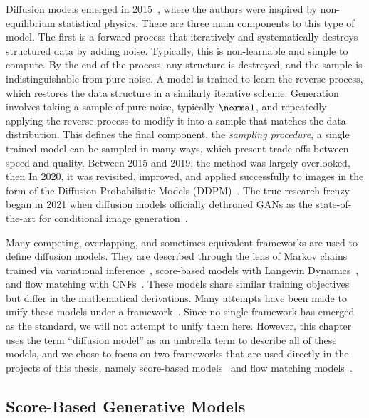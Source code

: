Diffusion models emerged in 2015~\cite{DeepUnsupervisedLearning}, where the authors were inspired by non-equilibrium statistical physics.
There are three main components to this type of model.
The first is a forward-process that iteratively and systematically destroys structured data by adding noise.
Typically, this is non-learnable and simple to compute.
By the end of the process, any structure is destroyed, and the sample is indistinguishable from pure noise.
A model is trained to learn the reverse-process, which restores the data structure in a similarly iterative scheme.
Generation involves taking a sample of pure noise, typically $\normal$,  and repeatedly applying the reverse-process to modify it into a sample that matches the data distribution.
This defines the final component, the \textit{sampling procedure}, a single trained model can be sampled in many ways, which present trade-offs between speed and quality.
Between 2015 and 2019, the method was largely overlooked, then
In 2020, it was revisited, improved, and applied successfully to images in the form of the Diffusion Probabilistic Models (DDPM)~\cite{DDPM}.
The true research frenzy began in 2021 when diffusion models officially dethroned GANs as the state-of-the-art for conditional image generation~\cite{DiffusionBeatsGANS}.

Many competing, overlapping, and sometimes equivalent frameworks are used to define diffusion models.
They are described through the lens of Markov chains trained via variational inference~\cite{DDPM, DDIM}, score-based models with Langevin Dynamics~\cite{ScoreBasedGenerativeModeling, ElucidatingDesignSpace}, and flow matching with CNFs~\cite{BuildingNormalizingFlows, FlowMatchingGenerative, FlowStraightFast}.
These models share similar training objectives but differ in the mathematical derivations.
Many attempts have been made to unify these models under a framework~\cite{CM2, ElucidatingDesignSpace, UnderstandingDiffusionModels, StochasticInterpolants, FlowStraightFast}.
Since no single framework has emerged as the standard, we will not attempt to unify them here.
However, this chapter uses the term ``diffusion model'' as an umbrella term to describe all of these models, and we chose to focus on two frameworks that are used directly in the projects of this thesis, namely score-based models~\cite{ScoreBasedGenerativeModeling} and flow matching models~\cite{BuildingNormalizingFlows, FlowMatchingGenerative, FlowStraightFast}.

\subsection{Score-Based Generative Models}
\newcommand{\score}{\nabla_{\x_t} \log p(\x_t)}
\newcommand{\cscore}{\nabla_{\x_t} \log p(\x_t|\x_0)}
\newcommand{\unitime}{\mathcal{U}(0, T)}
\newcommand{\timeone}{\mathcal{U}(0, 1)}

